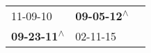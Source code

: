\begin{supertabular}{lll}
                  11-09-10\textsuperscript{} &  \textbf{09-05-12\textsuperscript{$\wedge$}} \\
 \textbf{09-23-11\textsuperscript{$\wedge$}} &                   02-11-15\textsuperscript{} \\
\end{supertabular}
